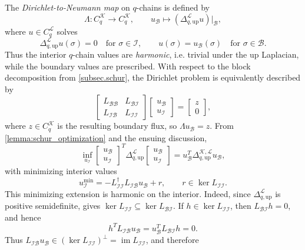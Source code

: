 \documentclass{article}
\newcommand{\KK}{\mathcal{K}}
\newcommand{\LL}{\mathcal{L}}
\begin{document}
The \emph{Dirichlet-to-Neumann map} on $q$-chains is defined by
\[
\Lambda:C_q^\KK\longrightarrow C_q^\KK,\qquad u_{\mathcal{B}}\longmapsto\left(\Delta_{q,\mathrm{up}}^\LL u\right)\big|_{\mathcal{B}},
\]
where $u\in C_q^\LL$ solves
\[
\Delta_{q,\mathrm{up}}^\LL u(\sigma)=0\quad\text{for }\sigma\in\mathcal{I},\qquad u(\sigma)=u_{\mathcal{B}}(\sigma)\quad\text{for }\sigma\in\mathcal{B}.
\]
Thus the interior $q$-chain values are \emph{harmonic}, i.e. trivial under the up Laplacian, while the boundary values are prescribed. With respect to the block decomposition from \cref{subsec.schur}, the Dirichlet problem is equivalently described by
\begin{equation}\label{eq:mtx_form_DtN}
\begin{bmatrix}L_{\mathcal{B}\mathcal{B}}&L_{\mathcal{B}\mathcal{I}}\\L_{\mathcal{I}\mathcal{B}}&L_{\mathcal{I}\mathcal{I}}\end{bmatrix}\begin{bmatrix}u_{\mathcal{B}}\\u_{\mathcal{I}}\end{bmatrix}=\begin{bmatrix}z\\0\end{bmatrix},
\end{equation}
where $z\in C_q^\KK$ is the resulting boundary flux, so $\Lambda u_{\mathcal{B}}=z$. From \cref{lemma:schur_optimization} and the ensuing discussion,
\[
\inf_{u_{\mathcal I}}\begin{bmatrix}u_{\mathcal B}\\u_{\mathcal I}\end{bmatrix}^T\Delta_{q,\mathrm{up}}^\LL\begin{bmatrix}u_{\mathcal B}\\u_{\mathcal I}\end{bmatrix}
=
u_{\mathcal B}^T\Delta_{q,\mathrm{up}}^{\KK,\LL}u_{\mathcal B},
\]
with minimizing interior values
\[
u_{\mathcal I}^{\min}=-L_{\mathcal I\mathcal I}^{\dagger}L_{\mathcal I\mathcal B}u_{\mathcal B}+r,\qquad r\in\ker L_{\mathcal I\mathcal I}.
\]
This minimizing extension is harmonic on the interior. Indeed, since $\Delta_{q,\mathrm{up}}^\LL$ is positive semidefinite, \cite[Theorem~1]{MR245582} gives $\ker L_{\mathcal I\mathcal I}\subseteq\ker L_{\mathcal B\mathcal I}$. If $h\in\ker L_{\mathcal I\mathcal I}$, then $L_{\mathcal B\mathcal I}h=0$, and hence
\[
h^TL_{\mathcal I\mathcal B}u_{\mathcal B}=u_{\mathcal B}^TL_{\mathcal B\mathcal I}h=0.
\]
Thus $L_{\mathcal I\mathcal B}u_{\mathcal B}\in(\ker L_{\mathcal I\mathcal I})^\perp=\operatorname{im}L_{\mathcal I\mathcal I}$, and therefore
\end{document}
